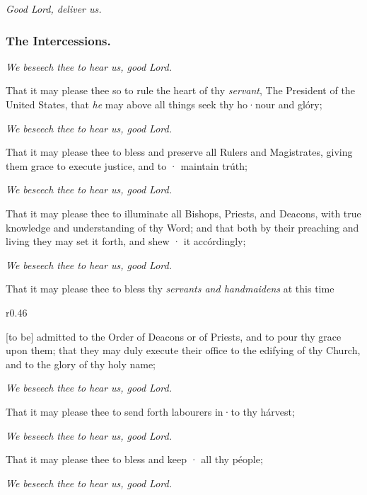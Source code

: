 \centerline{\emph{Good Lord, deliver us.}}


\subsubsection{The Intercessions.}

\centerline{\emph{We beseech thee to hear us, good Lord.}}

That it may please thee so to rule the heart of thy \emph{servant}, The President of the United States, that \emph{he} may above all things seek thy ho·nour and glóry;

\centerline{\emph{We beseech thee to hear us, good Lord.}}

That it may please thee to bless and preserve all Rulers and Magistrates, giving them grace to execute justice, and to · maintain trúth;

\centerline{\emph{We beseech thee to hear us, good Lord.}}

That it may please thee to illuminate all Bishops, Priests, and Deacons, with true knowledge and understanding of thy Word; and that both by their preaching and living they may set it forth, and shew · it accórdingly;

\centerline{\emph{We beseech thee to hear us, good Lord.}}

\begin{leftbar}
That it may please thee to bless thy \emph{servants and handmaidens} at this time \begin{wrapfigure}{r}{0.46\textwidth}\end{wrapfigure} [to be] admitted to the Order of Deacons or of Priests, and to pour thy grace upon them; that they may duly execute their office to the edifying of thy Church, and to the glory of thy holy name; 
\centerline{\emph{We beseech thee to hear us, good Lord.}}
\end{leftbar}
That it may please thee to send forth labourers in·to thy hárvest;

\centerline{\emph{We beseech thee to hear us, good Lord.}}

That it may please thee to bless and keep · all thy péople;

\centerline{\emph{We beseech thee to hear us, good Lord.}}

